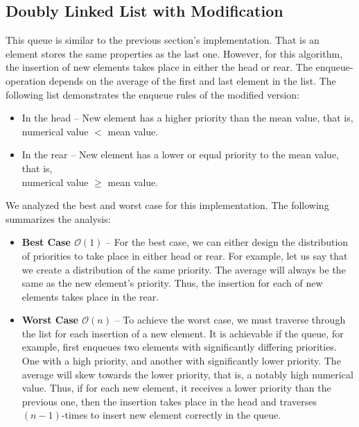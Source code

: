 \documentclass[a4paper,11pt]{kth-mag}
\newcommand*{\skippara}{\par\vspace{\baselineskip} \noindent}
\begin{document}
\subsection{Doubly Linked List with Modification}
This queue is similar to the previous section's implementation.
That is an element stores the same properties as the last one.
However, for this algorithm, the insertion of new elements takes place in either the head or rear.
The enqueue-operation depends on the average of the first and last element in the list.
The following list demonstrates the enqueue rules of the modified version:
\begin{itemize}
    \item In the head -- New element has a higher priority than the mean value, that is, \\numerical value $<$ mean value.
    \item In the rear -- New element has a lower or equal priority to the mean value, that is,\\numerical value $\ge$ mean value.
\end{itemize}

\skippara We analyzed the best and worst case for this implementation.
The following summarizes the analysis:
\begin{itemize}
    \item \textbf{Best Case $\mathcal{O}(1)$} --
       For the best case, we can either design the distribution of priorities to take place in either head or rear.
       For example, let us say that we create a distribution of the same priority.
       The average will always be the same as the new element's priority.
       Thus, the insertion for each of new elements takes place in the rear.
    \item \textbf{Worst Case $\mathcal{O}(n)$} --
        To achieve the worst case, we must traverse through the list for each insertion of a new element.
        It is achievable if the queue, for example, first enqueues two elements with significantly differing priorities.
        One with a high priority, and another with significantly lower priority.
        The average will skew towards the lower priority, that is, a notably high numerical value.
        Thus, if for each new element, it receives a lower priority than the previous one, then the insertion takes place in the head and traverses $(n - 1)$-times to insert new element correctly in the queue.
\end{itemize}
\end{document}
